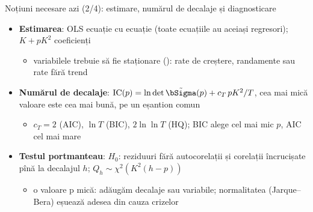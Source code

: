 \begin{frame}{Noțiuni necesare azi (2/4): estimare, numărul de decalaje și diagnosticare}
\itemsize{\small}
\begin{itemize}
    \item \textbf{Estimarea}: OLS ecuație cu ecuație (toate ecuațiile au aceiași regresori); $K + pK^2$ coeficienți
    \begin{itemize}
        \item variabilele trebuie să fie staționare (): rate de creștere, randamente sau rate fără trend
    \end{itemize}
    \item \textbf{Numărul de decalaje}: $\mathrm{IC}(p) = \ln\det\tilde\bSigma(p) + c_T\,pK^2/T$, cea mai mică valoare este cea mai bună, pe un eșantion comun
    \begin{itemize}
        \item $c_T = 2$ (AIC), $\ln T$ (BIC), $2\ln\ln T$ (HQ); BIC alege cel mai mic $p$, AIC cel mai mare
    \end{itemize}
    \item \textbf{Testul portmanteau}: $H_0$: reziduuri fără autocorelații și corelații încrucișate pînă la decalajul $h$; $Q_h \sim \chi^2(K^2(h - p))$
    \begin{itemize}
        \item o valoare p mică: adăugăm decalaje sau variabile; normalitatea (Jarque--Bera) eșuează adesea din cauza crizelor
    \end{itemize}
\end{itemize}
\end{frame}


